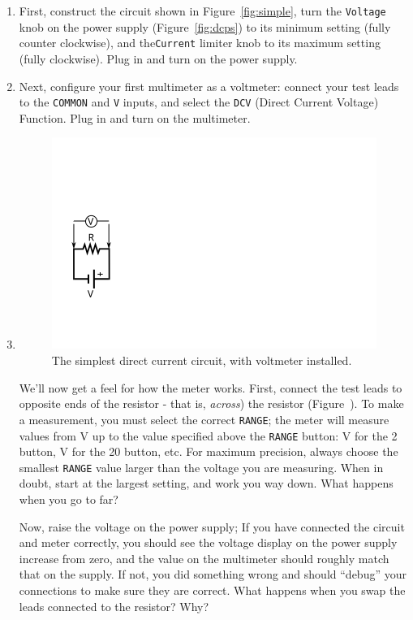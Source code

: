 \documentclass[12pt]{article}
\begin{document}
\begin{enumerate}
\item First, construct the circuit shown in Figure~\ref{fig:simple},
  turn the \texttt{Voltage} knob on the power supply
  (Figure~\ref{fig:dcps}) to its minimum setting (fully counter
  clockwise), and the\texttt{Current} limiter knob to its maximum
  setting (fully clockwise).  Plug in and turn on the power supply.
\item Next, configure your first multimeter as a voltmeter: connect
  your test leads to the \texttt{COMMON} and \texttt{V} inputs, and
  select the \texttt{DCV} (Direct Current Voltage) Function.  Plug in
  and turn on the multimeter.
\item 
  \begin{figure}
    \centering
    \includegraphics[width=\textwidth/5]{figures/simplest_with_voltmeter}
    \caption{The simplest direct current circuit, with voltmeter installed.}
    \label{fig:simplest_with_voltmeter}
  \end{figure}
  We'll now get a feel for how the meter works.  First, connect the
  test leads to opposite ends of the resistor - that is,
  \textit{across}) the resistor (Figure~).  To make a measurement, you
  must select the correct \texttt{RANGE}; the meter will measure
  values from \unit[0]{V} up to the value specified above the
  \texttt{RANGE} button: \unit[2]{V} for the 2 button, \unit[20]{V}
  for the 20 button, etc.  For maximum precision, always choose the
  smallest \texttt{RANGE} value larger than the voltage you are
  measuring.  When in doubt, start at the largest setting, and work
  you way down.  What happens when you go to far?

  Now, raise the voltage on the power supply; If you have connected
  the circuit and meter correctly, you should see the voltage display
  on the power supply increase from zero, and the value on the
  multimeter should roughly match that on the supply.  If not, you did
  something wrong and should ``debug'' your connections to make sure
  they are correct.  What happens when you swap the leads connected to
  the resistor?  Why?


\end{enumerate}
\end{document}
